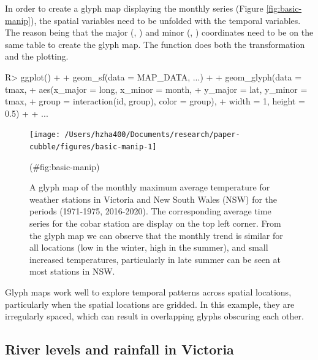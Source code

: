 \documentclass[
]{jss}
\begin{document}
In order to create a glyph map displaying the monthly series (Figure
\ref{fig:basic-manip}), the spatial variables need to be unfolded with
the temporal variables. The reason being that the major (,
) and minor (, ) coordinates need to be
on the same table to create the glyph map. The 
function does both the transformation and the plotting.

\begin{CodeChunk}
\begin{CodeInput}
R> ggplot() +
+   geom_sf(data = MAP_DATA, ...) +
+   geom_glyph(data = tmax,
+              aes(x_major = long, x_minor = month,
+                  y_major = lat, y_minor = tmax,
+                  group = interaction(id, group), color = group),
+              width = 1, height = 0.5) + 
+   ...
\end{CodeInput}
\end{CodeChunk}

\begin{CodeChunk}
\begin{figure}

{\centering \texttt{[image: /Users/hzha400/Documents/research/paper-cubble/figures/basic-manip-1]} 

}

\caption[A glyph map of the monthly maximum average temperature for weather stations in  Victoria and New South Wales (NSW) for the periods (1971-1975, 2016-2020)]{A glyph map of the monthly maximum average temperature for weather stations in  Victoria and New South Wales (NSW) for the periods (1971-1975, 2016-2020). The corresponding average time series for the cobar station are display on the top left corner. From the glyph map we can observe that the monthly trend is similar for all locations (low in the winter, high in the summer), and small increased temperatures, particularly in late summer can be seen at most stations in NSW.}(\#fig:basic-manip)
\end{figure}
\end{CodeChunk}

Glyph maps work well to explore temporal patterns across spatial
locations, particularly when the spatial locations are gridded. In this
example, they are irregularly spaced, which can result in overlapping
glyphs obscuring each other.

\hypertarget{river-levels-and-rainfall-in-victoria}{%
\subsection{River levels and rainfall in
Victoria}\label{river-levels-and-rainfall-in-victoria}}
\end{document}
